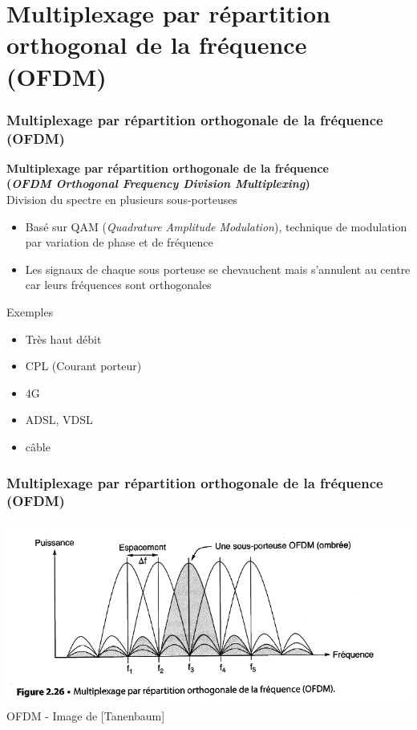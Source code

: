 \section{Multiplexage par répartition orthogonal de la fréquence (OFDM)}

\begin{frame}[fragile]
  \frametitle{Multiplexage par répartition orthogonale de la fréquence (OFDM)}
{\large\bf Multiplexage par répartition orthogonale de la fréquence \\
(\textit{OFDM Orthogonal Frequency Division Multiplexing})}\\
Division du spectre en plusieurs sous-porteuses
\begin{itemize}
	\item Basé sur QAM (\textit{Quadrature Amplitude Modulation}), technique de
	modulation par variation de phase et de fréquence
	\item Les signaux de chaque sous porteuse se chevauchent mais s'annulent au
	centre car leurs fréquences sont orthogonales
\end{itemize}
\vspace{.6cm}
Exemples 
\begin{itemize}
	\item Très haut débit
	\item CPL (Courant porteur)
	\item 4G
	\item ADSL, VDSL
	\item câble
\end{itemize}
\end{frame}

\begin{frame}[fragile]
  \frametitle{Multiplexage par répartition orthogonale de la fréquence (OFDM)}
\begin{center}
	\includegraphics[width=.8\linewidth]{img/2-26.png}\\
	{\scriptsize OFDM - Image de [Tanenbaum]}
\end{center}
\end{frame}


